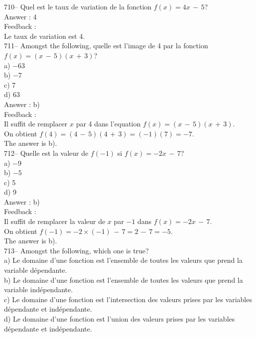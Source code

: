 \documentclass[letterpaper, 12pt]{article}
\begin{document}
710-- Quel est le taux de variation de la fonction $f(x)=4x\,-\,5$?\\

Answer :  4\\

Feedback :  \\
Le taux de variation est 4.\\

711-- Amongst the following, quelle est l'image de 4 par la
fonction $f(x)=(x\,-\,5)(x\,+\,3)$?\\
a) $-63$\\
b) $-7$\\
c) 7\\
d) 63\\

Answer : b)\\

Feedback : \\
Il suffit de remplacer $x$ par 4 dans l'equation
$f(x)=(x\,-\,5)(x\,+\,3)$.\\
On obtient $f(4)=(4\,-\,5)(4\,+\,3)=(-1)(7)=-7$.\\
The answer is b).\\

712-- Quelle est la valeur de $f(-1)$ si $f(x)=-2x\,-\,7$?\\
a) $-9$\\
b) $-5$\\
c) 5\\
d) 9\\

Answer : b)\\

Feedback : \\
Il suffit de remplacer la valeur de $x$ par $-1$ dans $f(x)=-2x\,-\,7$.\\
On obtient $f(-1)=-2\times(-1)\,-\,7=2\,-\,7=-5$.\\
The answer is b).\\

713--  Amongst the following, which one is true?\\
a) Le domaine d'une fonction est l'ensemble de toutes les valeurs que prend
la variable d\'ependante.\\
b) Le domaine d'une fonction est l'ensemble de toutes les valeurs que prend
la variable ind\'ependante.\\
c) Le domaine d'une fonction est l'intersection des valeurs prises par les
variables d\'ependante et ind\'ependante.\\
d) Le domaine d'une fonction est l'union des valeurs prises par les
variables d\'ependante et ind\'ependante.\\
\end{document}
